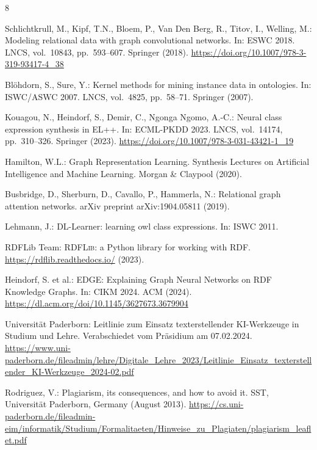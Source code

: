 \documentclass[runningheads]{llncs}
\begin{document}
%
%
%
% 
% 
%
\begin{thebibliography}{8}

Schlichtkrull, M., Kipf, T.N., Bloem, P., Van Den Berg, R., Titov, I., Welling, M.:
Modeling relational data with graph convolutional networks.
In: ESWC 2018. LNCS, vol.~10843, pp.~593--607. Springer (2018).
\url{https://doi.org/10.1007/978-3-319-93417-4_38}

Bl{\"o}hdorn, S., Sure, Y.:
Kernel methods for mining instance data in ontologies.
In: ISWC/ASWC 2007. LNCS, vol.~4825, pp.~58--71. Springer (2007).

Kouagou, N., Heindorf, S., Demir, C., Ngonga Ngomo, A.-C.:
Neural class expression synthesis in \textsc{EL++}.
In: ECML-PKDD 2023. LNCS, vol.~14174, pp.~310--326. Springer (2023).
\url{https://doi.org/10.1007/978-3-031-43421-1_19}

Hamilton, W.L.:
Graph Representation Learning.
Synthesis Lectures on Artificial Intelligence and Machine Learning.
Morgan \& Claypool (2020).

Busbridge, D., Sherburn, D., Cavallo, P., Hammerla, N.:
Relational graph attention networks.
arXiv preprint arXiv:1904.05811 (2019).

Lehmann, J.:
DL-Learner: learning owl class expressions. In: ISWC 2011.

RDFLib Team:
\textsc{RDFLib}: a Python library for working with RDF.
\url{https://rdflib.readthedocs.io/} (2023).

Heindorf, S. et al.:
\textsc{EDGE}: Explaining Graph Neural Networks on RDF Knowledge Graphs.
In: CIKM 2024. ACM (2024).
\url{https://dl.acm.org/doi/10.1145/3627673.3679904}

Universit{\"a}t Paderborn:
Leitlinie zum Einsatz texterstellender KI-Werkzeuge in Studium und Lehre.
Verabschiedet vom Pr{\"a}sidium am 07.02.2024.
\url{https://www.uni-paderborn.de/fileadmin/lehre/Digitale_Lehre_2023/Leitlinie_Einsatz_texterstellender_KI-Werkzeuge_2024-02.pdf}

Rodriguez, V.:
Plagiarism, its consequences, and how to avoid it.
SST, Universit{\"a}t Paderborn, Germany (August 2013).
\url{https://cs.uni-paderborn.de/fileadmin-eim/informatik/Studium/Formalitaeten/Hinweise_zu_Plagiaten/plagiarism_leaflet.pdf}

\end{thebibliography}
\end{document}
